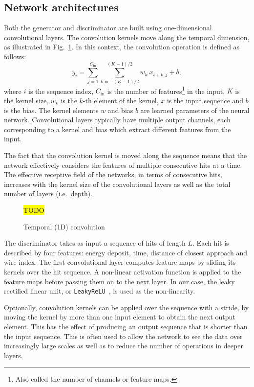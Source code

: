 \subsection{Network architectures}
Both the generator and discriminator are built using one-dimensional convolutional layers.
The convolution kernels move along the temporal dimension, as illustrated in Fig.~\ref{fig:temporal_conv}. 
In this context, the convolution operation is defined as follows:
\begin{equation}
    y_{i} = \sum_{j=1}^{C_\mathrm{in}} \sum_{k=-(K-1)/2}^{(K-1)/2} w_k\ x_{i+k,j} + b,
\end{equation}
where $i$ is the sequence index, $C_\mathrm{in}$ is the number of features\footnote{Also called the number of channels or feature maps.} in the input, $K$ is the kernel size, $w_k$ is the $k$-th element of the kernel, $x$ is the input sequence and $b$ is the bias. The kernel elements $w$ and bias $b$ are learned parameters of the neural network. 
Convolutional layers typically have multiple output channels, each corresponding to a kernel and bias which extract different features from the input.

The fact that the convolution kernel is moved along the sequence means that the network effectively considers the features of multiple consecutive hits at a time. The effective receptive field of the networks, in terms of consecutive hits, increases with the kernel size of the convolutional layers as well as the total number of layers (i.e.\ depth).
\begin{figure}
    \centering
    \hl{TODO}
    \caption{Temporal (1D) convolution}
    \label{fig:temporal_conv}
\end{figure}

The discriminator takes as input a sequence of hits of length $L$. Each hit is described by four features: energy deposit, time, distance of closest approach and wire index. The first convolutional layer computes feature maps by sliding its kernels over the hit sequence. A non-linear activation function is applied to the feature maps before passing them on to the next layer. 
In our case, the leaky rectified linear unit, or \texttt{LeakyReLU}~\cite{Maas13rectifiernonlinearities}, is used as the non-linearity.

Optionally, convolution kernels can be applied over the sequence with a stride, by moving the kernel by more than one input element to obtain the next output element. This has the effect of producing an output sequence that is shorter than the input sequence. This is often used to allow the network to see the data over increasingly large scales as well as to reduce the number of operations in deeper layers. 

